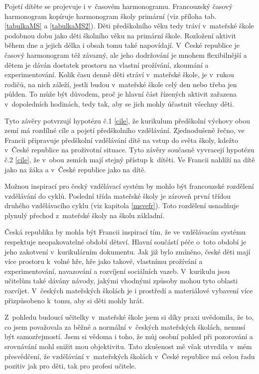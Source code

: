 Pojetí dítěte se projevuje i v~časovém harmonogramu. Francouzský časový harmonogram kopíruje harmonogram školy primární (viz příloha tab. \ref{tabulkaMS} a \ref{tabulkaMS2}). Děti předškolního věku tedy tráví v~mateřské škole podobnou dobu jako děti školního věku na primární škole. Rozložení aktivit během dne a jejich délka i obsah tomu také napovídají. V~České republice je časový harmonogram též závazný, ale jeho dodržování je mnohem flexibilnější a dětem je dáván dostatek prostoru na vlastní prožívání, zkoumání a experimentování. Kolik času denně  děti stráví v~mateřské škole, je v~rukou rodičů, na nich záleží, jestli budou v~mateřské škole celý den nebo třeba jen půlden. To může být důvodem, proč je hlavní část řízených aktivit zařazena v~dopoledních hodinách, tedy tak, aby se jich mohly účastnit všechny děti. 

Tyto závěry potvrzují hypotézu č.1 \ref{cile}, že kurikulum předškolní výchovy obou zemí má rozdílné cíle a pojetí předškolního vzdělávání. Zjednodušeně řečno, ve Francii připravuje předškolní vzdělávání dítě na vstup do světa školy, kdežto v~České republice na proživotní situace. Tyto závěry současně vyvracejí hypotézu č.2 \ref{cile}, že v~obou zemích mají stejný přístup k~dítěti. Ve Francii nahlíží na dítě jako na žáka a v~České republice jako na dítě. 

Možnou inspirací pro český vzdělávací systém by mohlo být francouzské rozdělení vzdělávání do cyklů. Poslední třída mateřské školy je zároveň první třídou druhého vzdělávacího cyklu (viz kapitola \ref{msvefr}). Toto rozdělení usnadňuje plynulý přechod z~mateřské školy na školu základní. 

Česká republika by mohla být Francii inspirací tím, že ve vzdělávacím systému respektuje neopakovatelné období dětsví. Hlavní součástí péče o~toto období je jeho zakotvení v~kurikulárním dokumentu. Jak již bylo zmíněno, české děti mají více prostoru k~volné hře, hře jako takové, vlastnímu prožívání a experimentování, navazování a rozvíjení sociálních vazeb. V~kurikulu jsou učitelům také dávány návody, jakými vhodnými způsoby mohou tyto oblasti rozvíjet. V~českých mateřských školách je i prostředí a materiálové vybavení více přizpůsobeno k~tomu, aby si děti mohly hrát.

Z~pohledu budoucí učitelky v~mateřské škole jsem si díky praxi uvědomila, že to, co jsem považovala za běžné a normální v~českých mateřských školách, nemusí být samozřejmostí. Jsem si vědoma i toho, že můj osobní pohled při pozorování a srovnávání mohl snižit mou objektivitu. Tato zkušenost mě však utvrdila v~mém přesvědčení, že vzdělávání v~mateřských školách v~České republice má celou řadu pozitiv jak pro děti, tak pro profesi učitele. 